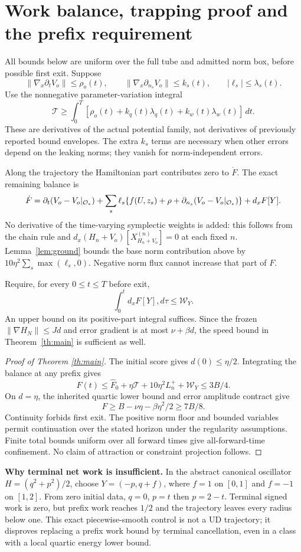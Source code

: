 \documentclass[11pt,a4paper]{article}
\begin{document}
\section{Work balance, trapping proof and the prefix requirement}
All bounds below are uniform over the full tube and admitted norm box, before possible first exit. Suppose
\[
\|\nabla_x\partial_tV_o\|\le\rho_o(t),\qquad
\|\nabla_x\partial_{n_s}V_o\|\le k_s(t),\qquad
|\ell_s|\le\lambda_s(t).
\]
Use the nonnegative parameter-variation integral
\[
\mathcal T\ge\int_0^T[\rho_o(t)+k_q(t)\lambda_q(t)+k_w(t)\lambda_w(t)]\,dt.
\]
These are derivatives of the actual potential family, not derivatives of previously reported bound envelopes. The extra $k_s$ terms are necessary when other errors depend on the leaking norms; they vanish for norm-independent errors.

Along the trajectory the Hamiltonian part contributes zero to $\dot F$. The exact remaining balance is
\[
\dot F=\partial_t(V_o-V_o|_{\mathcal O_*})
+\sum_s\ell_s\{f(U,z_s)+\rho+\partial_{n_s}(V_o-V_o|_{\mathcal O_*})\}
+d_xF[Y].
\]
No derivative of the time-varying symplectic weights is added: this follows from the chain rule and $d_x(H_n+V_o)[X_{H_n+V_o}^{(n)}]=0$ at each fixed $n$. Lemma~\ref{lem:ground} bounds the base norm contribution above by $10\eta^2\sum_s\max(\ell_s,0)$. Negative norm flux cannot increase that part of $F$.

Require, for every $0\le t\le T$ before exit,
\[
\int_0^t d_xF[Y],d\tau\le\mathcal W_Y.
\]
An upper bound on its positive-part integral suffices. Since the frozen $\|\nabla H_N\|\le Jd$ and error gradient is at most $\nu+\beta d$, the speed bound in Theorem~\ref{th:main} is sufficient as well.
\begin{proof}[Proof of Theorem \ref{th:main}]
The initial score gives $d(0)\le\eta/2$. Integrating the balance at any prefix gives
\[
F(t)\le\widehat F_0+\eta\mathcal T+10\eta^2L_n^++\mathcal W_Y\le3B/4.
\]
On $d=\eta$, the inherited quartic lower bound and error amplitude contract give
\[
F\ge B-\nu\eta-\beta\eta^2/2\ge7B/8.
\]
Continuity forbids first exit. The positive norm floor and bounded variables permit continuation over the stated horizon under the regularity assumptions. Finite total bounds uniform over all forward times give all-forward-time confinement. No claim of attraction or constraint projection follows.
\end{proof}
\textbf{Why terminal net work is insufficient.} In the abstract canonical oscillator $H=(q^2+p^2)/2$, choose $Y=(-p,q+f)$, where $f=1$ on $[0,1]$ and $f=-1$ on $[1,2]$. From zero initial data, $q=0$, $p=t$ then $p=2-t$. Terminal signed work is zero, but prefix work reaches $1/2$ and the trajectory leaves every radius below one. This exact piecewise-smooth control is not a UD trajectory; it disproves replacing a prefix work bound by terminal cancellation, even in a class with a local quartic energy lower bound.
\newpage
\end{document}
